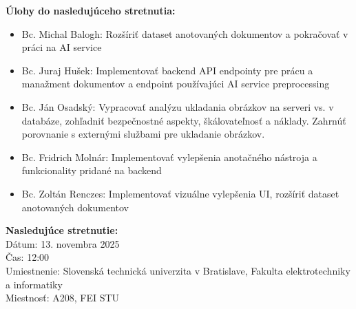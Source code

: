 \vspace{0.5cm}
\textbf{Úlohy do nasledujúceho stretnutia:}
\begin{itemize}
    \item Bc. Michal Balogh: Rozšíriť dataset anotovaných dokumentov a pokračovať v práci na AI service
    \item Bc. Juraj Hušek: Implementovať backend API endpointy pre prácu a manažment dokumentov a endpoint používajúci AI service preprocessing
    \item Bc. Ján Osadský: Vypracovať analýzu ukladania obrázkov na serveri vs. v databáze, zohľadniť bezpečnostné aspekty, škálovateľnosť a náklady. Zahrnúť porovnanie s externými službami pre ukladanie obrázkov.
    \item Bc. Fridrich Molnár: Implementovať vylepšenia anotačného nástroja a funkcionality pridané na backend
    \item Bc. Zoltán Renczes: Implementovať vizuálne vylepšenia UI, rozšíriť dataset anotovaných dokumentov
\end{itemize}

\vspace{0.5cm}
\textbf{Nasledujúce stretnutie:} \\
Dátum: 13. novembra 2025 \\
Čas: 12:00 \\
Umiestnenie: Slovenská technická univerzita v Bratislave, Fakulta elektrotechniky a informatiky \\
Miestnosť: A208, FEI STU
